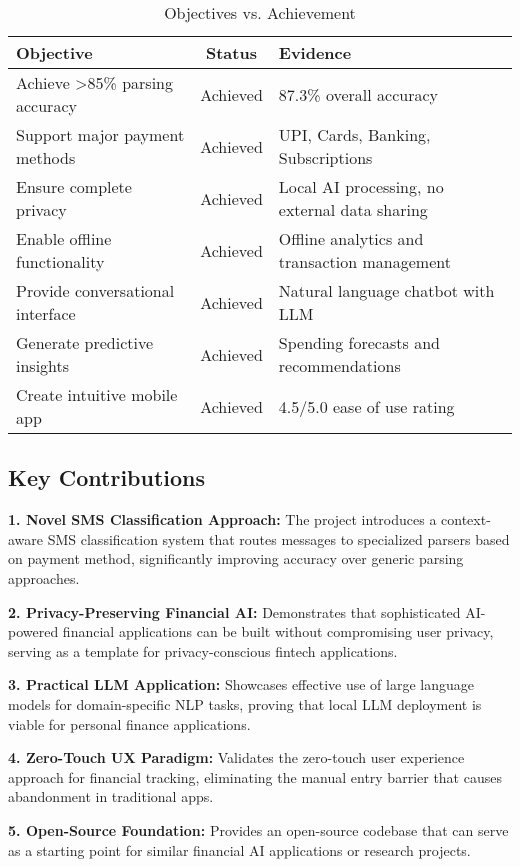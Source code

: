 \documentclass[11pt,a4paper]{report}
\begin{document}
\begin{itemize}
\begin{itemize}
\begin{table}[H]
\centering
\caption{Objectives vs. Achievement}
\begin{tabularx}{\textwidth}{|X|c|X|}
\hline
\textbf{Objective} & \textbf{Status} & \textbf{Evidence} \\
\hline
Achieve >85\% parsing accuracy & Achieved & 87.3\% overall accuracy \\
Support major payment methods & Achieved & UPI, Cards, Banking, Subscriptions \\
Ensure complete privacy & Achieved & Local AI processing, no external data sharing \\
Enable offline functionality & Achieved & Offline analytics and transaction management \\
Provide conversational interface & Achieved & Natural language chatbot with LLM \\
Generate predictive insights & Achieved & Spending forecasts and recommendations \\
Create intuitive mobile app & Achieved & 4.5/5.0 ease of use rating \\
\hline
\end{tabularx}
\end{table}

\subsection{Key Contributions}

\textbf{1. Novel SMS Classification Approach:}
The project introduces a context-aware SMS classification system that routes messages to specialized parsers based on payment method, significantly improving accuracy over generic parsing approaches.

\textbf{2. Privacy-Preserving Financial AI:}
Demonstrates that sophisticated AI-powered financial applications can be built without compromising user privacy, serving as a template for privacy-conscious fintech applications.

\textbf{3. Practical LLM Application:}
Showcases effective use of large language models for domain-specific NLP tasks, proving that local LLM deployment is viable for personal finance applications.

\textbf{4. Zero-Touch UX Paradigm:}
Validates the zero-touch user experience approach for financial tracking, eliminating the manual entry barrier that causes abandonment in traditional apps.

\textbf{5. Open-Source Foundation:}
Provides an open-source codebase that can serve as a starting point for similar financial AI applications or research projects.


\end{itemize}
\end{itemize}
\end{document}
